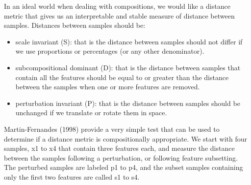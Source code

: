 \documentclass[onecolumn]{article}
\providecommand{\tightlist}{%
  \setlength{\itemsep}{0pt}\setlength{\parskip}{0pt}}
\begin{document}
In an ideal world when dealing with compositions, we would like a distance metric that gives us an interpretable and stable measure of distance between samples. Distances between samples should be:

\begin{itemize}
\tightlist
\item
  scale invariant (S): that is the distance between samples should not differ if we use proportions or percentages (or any other denominator).
\item
  subcompositional dominant (D): that is the distance between samples that contain all the features should be equal to or greater than the distance between the samples when one or more features are removed.
\item
  perturbation invariant (P): that is the distance between samples should be unchanged if we translate or rotate them in space.
\end{itemize}

Martin-Fernandes (1998) provide a very simple test that can be used to determine if a distance metric is compositionally appropriate. We start with four samples, x1 to x4 that contain three features each, and measure the distance between the samples following a perturbation, or following feature subsetting. The perturbed samples are labeled p1 to p4, and the subset samples containing only the first two features are called s1 to s4.
\end{document}
